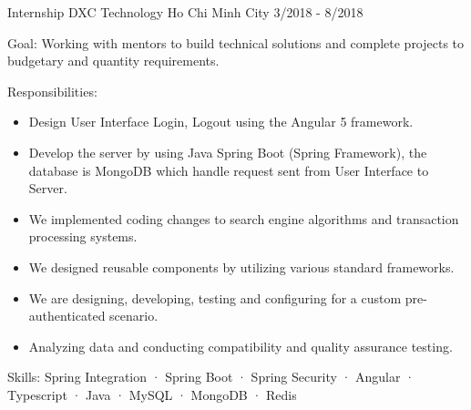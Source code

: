   \cventry
    {Internship} %
    {DXC Technology} %
    {Ho Chi Minh City} %
    {3/2018 - 8/2018} %
    {
      \begin{cvitems} %
        \item {Goal: Working with mentors to build technical solutions and complete projects to budgetary and quantity requirements.}
        \item {Responsibilities: }
        {
            \begin{itemize} %
                \item {Design User Interface Login, Logout using the Angular 5 framework.}
                \item {Develop the server by using Java Spring Boot (Spring Framework), the database is MongoDB which handle request sent from User Interface to Server.}
                \item {We implemented coding changes to search engine algorithms and transaction processing systems.}
                \item {We designed reusable components by utilizing various standard frameworks.}
                \item {We are designing, developing, testing and configuring for a custom pre-authenticated scenario.}
                \item {Analyzing data and conducting compatibility and quality assurance testing.}
            \end{itemize}
        }
        \item {Skills: Spring Integration · Spring Boot · Spring Security · Angular · Typescript · Java · MySQL · MongoDB · Redis}
      \end{cvitems}
    }
